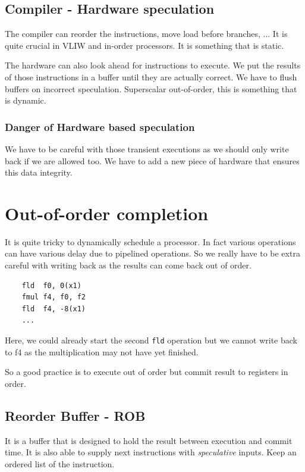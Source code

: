 \documentclass{report}
\begin{document}
\subsection{Compiler - Hardware speculation}

The compiler can reorder the instructions, move load before branches, ... It is quite crucial in VLIW and in-order processors. It is something that is static.

The hardware can also look ahead for instructions to execute. We put the results of those instructions in a buffer until they are actually correct. We have to flush buffers on incorrect speculation. Superscalar out-of-order, this is something that is dynamic. 

\subsubsection{Danger of Hardware based speculation}

We have to be careful with those transient executions as we should only write back if we are allowed too. We have to add a new piece of hardware that ensures this data integrity.

\section{Out-of-order completion}

It is quite tricky to dynamically schedule a processor. In fact various operations can have various delay due to pipelined operations. So we really have to be extra careful with writing back as the results can come back out of order.

\begin{lstlisting}
    fld  f0, 0(x1)
    fmul f4, f0, f2
    fld  f4, -8(x1)
    ...
\end{lstlisting}

Here, we could already start the second \texttt{fld} operation but we cannot write back to f4 as the multiplication may not have yet finished.

So a good practice is to execute out of order but commit result to registers in order.

\subsection{Reorder Buffer - ROB}

It is a buffer that is designed to hold the result between execution and commit time. It is also able to supply next instructions with \textit{speculative} inputs. Keep an ordered list of the instruction.
\end{document}
